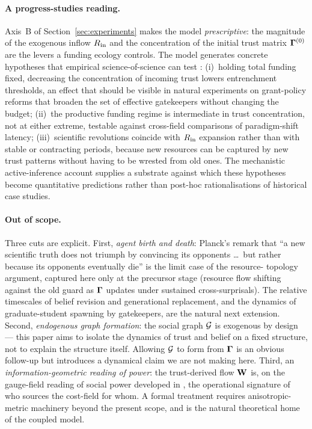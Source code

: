 \paragraph{A progress-studies reading.}
Axis~B of Section~\ref{sec:experiments} makes the model
\emph{prescriptive}: the magnitude of the exogenous inflow
$R_{\mathrm{in}}$ and the concentration of the initial trust matrix
$\boldsymbol{\Gamma}^{(0)}$ are the levers a funding ecology controls. The
model generates concrete hypotheses that empirical science-of-science
can test \citep{wang2021ScienceOfScience, azoulay2019StarsShadow,
collison2019ProgressStudies}: (i)~holding total funding fixed,
decreasing the concentration of incoming trust lowers entrenchment
thresholds, an effect that should be visible in natural experiments
on grant-policy reforms that broaden the set of effective gatekeepers
without changing the budget; (ii)~the productive funding regime is
intermediate in trust concentration, not at either extreme, testable
against cross-field comparisons of paradigm-shift latency;
(iii)~scientific revolutions coincide with $R_{\mathrm{in}}$ expansion
rather than with stable or contracting periods, because new resources
can be captured by new trust patterns without having to be wrested
from old ones. The mechanistic active-inference account supplies a
substrate against which these hypotheses become quantitative
predictions rather than post-hoc rationalisations of historical case
studies.

\paragraph{Out of scope.}
Three cuts are explicit. First, \emph{agent birth and death}: Planck's
remark that ``a new scientific truth does not triumph by convincing
its opponents \dots\ but rather because its opponents eventually die''
\citep{planck1949Autobiography} is the limit case of the resource-%
topology argument, captured here only at the precursor stage
(resource flow shifting against the old guard as $\boldsymbol{\Gamma}$ updates
under sustained cross-surprisals). The relative timescales of belief
revision and generational replacement, and the dynamics of
graduate-student spawning by gatekeepers, are the natural next
extension. Second, \emph{endogenous graph formation}: the social
graph $\mathcal{G}$ is exogenous by design --- this paper aims to isolate
the dynamics of trust and belief on a fixed structure, not to explain
the structure itself. Allowing $\mathcal{G}$ to form from $\boldsymbol{\Gamma}$ is an
obvious follow-up but introduces a dynamical claim we are not making
here. Third, an \emph{information-geometric reading of power}: the
trust-derived flow $\mathbf{W}$ is, on the gauge-field reading of
social power developed in \citep{albarracin2025SocialPower}, the
operational signature of who sources the cost-field for whom. A
formal treatment requires anisotropic-metric machinery beyond the
present scope, and is the natural theoretical home of the coupled
model.


